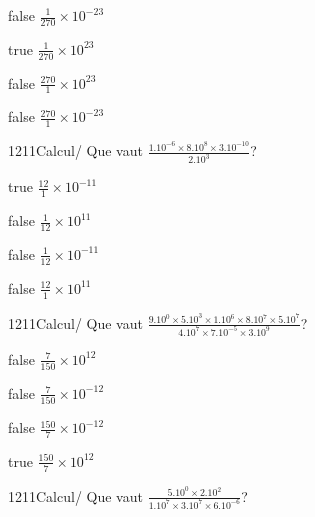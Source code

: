 \documentclass[11pt]{article}
\begin{document}
            \begin{reponses}
                \item[false] $\frac{1}{270}\times 10^{-23}$
                \item[true] $\frac{1}{270}\times 10^{23}$
                \item[false] $\frac{270}{1}\times 10^{23}$
                \item[false] $\frac{270}{1}\times 10^{-23}$
            \end{reponses}
            
            \begin{question}{1211}{Calcul}{}{/}
                Que vaut $\frac{1.10^{-6}\times 8.10^{8}\times 3.10^{-10}}{2.10^{3}}$?
            \end{question}
            
            \begin{reponses}
                \item[true] $\frac{12}{1}\times 10^{-11}$
                \item[false] $\frac{1}{12}\times 10^{11}$
                \item[false] $\frac{1}{12}\times 10^{-11}$
                \item[false] $\frac{12}{1}\times 10^{11}$
            \end{reponses}
            
            \begin{question}{1211}{Calcul}{}{/}
                Que vaut $\frac{9.10^{0}\times 5.10^{3}\times 1.10^{6}\times 8.10^{7}\times 5.10^{7}}{4.10^{7}\times 7.10^{-5}\times 3.10^{9}}$?
            \end{question}
            
            \begin{reponses}
                \item[false] $\frac{7}{150}\times 10^{12}$
                \item[false] $\frac{7}{150}\times 10^{-12}$
                \item[false] $\frac{150}{7}\times 10^{-12}$
                \item[true] $\frac{150}{7}\times 10^{12}$
            \end{reponses}
            
            \begin{question}{1211}{Calcul}{}{/}
                Que vaut $\frac{5.10^{0}\times 2.10^{2}}{1.10^{7}\times 3.10^{7}\times 6.10^{-6}}$?
            \end{question}
            
\end{document}
